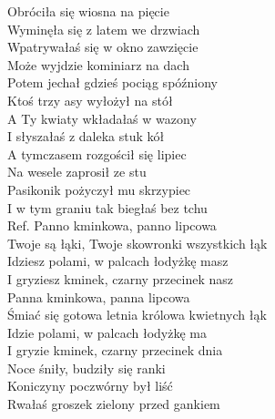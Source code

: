 
\begin{flushleft}
Obróciła się wiosna na pięcie \tab{}\\
Wyminęła się z latem we drzwiach \\
Wpatrywałaś się w okno zawzięcie \\
Może wyjdzie kominiarz na dach \\
Potem jechał gdzieś pociąg spóźniony \\
Ktoś trzy asy wyłożył na stół \tab{}\\
A Ty kwiaty wkładałaś w wazony \\
I słyszałaś z daleka stuk kół \tab{}\\
\vskip 3mm
A tymczasem rozgościł się lipiec  \\
Na wesele zaprosił ze stu  \tab{}\\
Pasikonik pożyczył mu skrzypiec  \\
I w tym graniu tak biegłaś bez tchu  \\
\vskip 3mm
Ref. Panno kminkowa, panno lipcowa \tab{}\\
\hspace{0.9cm}Twoje są łąki, Twoje skowronki wszystkich łąk \\
\hspace{0.9cm}Idziesz polami, w palcach łodyżkę masz \tab{}\\
\hspace{0.9cm}I gryziesz kminek, czarny przecinek nasz \tab{}\\
\vskip 3mm
\hspace{0.9cm}Panna kminkowa, panna lipcowa \\
\hspace{0.9cm}Śmiać się gotowa letnia królowa kwietnych łąk \\
\hspace{0.9cm}Idzie polami, w palcach łodyżkę ma \\
\hspace{0.9cm}I gryzie kminek, czarny przecinek dnia \\
\vskip 3mm
Noce śniły, budziły się ranki \\
Koniczyny poczwórny był liść \\
Rwałaś groszek zielony przed gankiem \\

\end{flushleft}
